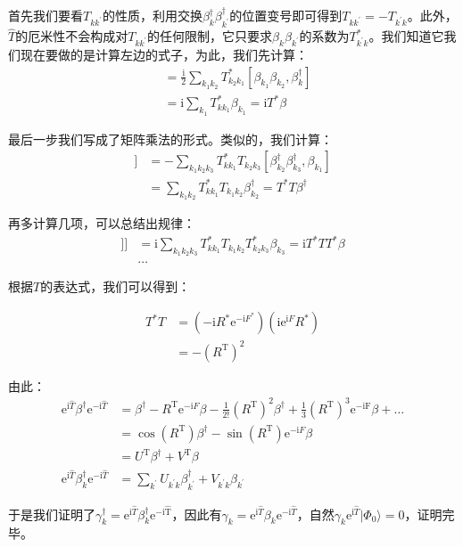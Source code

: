 \begin{booknote*}
首先我们要看$T_{kk^{\prime}}$的性质，利用交换$\beta^{\dagger}_{k}\beta^{\dagger}_{k^{\prime}}$的位置变号即可得到$T_{kk^{\prime}}=-T_{k^{\prime}k}$。此外，$\hat{T}$的厄米性不会构成对$T_{kk^{\prime}}$的任何限制，它只要求$\beta_{k}\beta_{k^{\prime}}$的系数为$T^{*}_{k^{\prime}k}$。我们知道它我们现在要做的是计算左边的式子，为此，我们先计算：
\begin{align*}
[\mathrm{i}\hat{T},\beta^{\dagger}_{k}] & =\frac{\mathrm{i}}{2}\sum_{k_{1}k_{2}}T^{*}_{k_{2}k_{1}}[\beta_{k_{1}}\beta_{k_{2}},\beta^{\dagger}_{k}]\\
 & =\mathrm{i}\sum_{k_{1}}T^{*}_{kk_{1}}\beta_{k_{1}}=\mathrm{i}T^{*}\beta
\end{align*}

最后一步我们写成了矩阵乘法的形式。类似的，我们计算：
\begin{align*}
[\mathrm{i}\hat{T},[\mathrm{i}\hat{T},\beta^{\dagger}_{k}]] & =-\sum_{k_{1}k_{2}k_{3}}T^{*}_{kk_{1}}T_{k_{2}k_{3}}[\beta^{\dagger}_{k_{2}}\beta^{\dagger}_{k_{3}},\beta_{k_{1}}]\\
 & =\sum_{k_{1}k_{2}}T^{*}_{kk_{1}}T_{k_{1}k_{2}}\beta^{\dagger}_{k_{2}}=T^{*}T\beta^{\dagger}
\end{align*}

再多计算几项，可以总结出规律：
\begin{align*}
[\mathrm{i}\hat{T},[\mathrm{i}\hat{T},[\mathrm{i}\hat{T},\beta^{\dagger}_{k}]]] & =\mathrm{i}\sum_{k_{1}k_{2}k_{3}}T^{*}_{kk_{1}}T_{k_{1}k_{2}}T^{*}_{k_{2}k_{3}}\beta_{k_{3}}=\mathrm{i}T^{*}TT^{*}\beta\\
 & \dots
\end{align*}

根据$T$的表达式，我们可以得到：

\begin{align*}
T^{*}T & =(-\mathrm{i}R^{*}\mathrm{e}^{-\mathrm{i}F^{*}})(\mathrm{i}\mathrm{e}^{\mathrm{i}F}R^{*})\\
 & =-(R^{\mathrm{T}})^{2}
\end{align*}

由此：
\begin{align*}
\mathrm{e}^{\mathrm{i}\hat{T}}\beta^{\dagger}\mathrm{e}^{-\mathrm{i}\hat{T}} & =\beta^{\dagger}-R^{\mathrm{T}}\mathrm{e}^{-\mathrm{i}F}\beta-\frac{1}{2!}(R^{\mathrm{T}})^{2}\beta^{\dagger}+\frac{1}{3}(R^{\mathrm{T}})^{3}\mathrm{e}^{\mathrm{-\mathrm{i}F}}\beta+\dots\\
 & =\cos(R^{\mathrm{T}})\beta^{\dagger}-\sin(R^{\mathrm{T}})\mathrm{e}^{-\mathrm{i}F}\beta\\
 & =U^{\mathrm{T}}\beta^{\dagger}+V^{\mathrm{T}}\beta\\
\mathrm{e}^{\mathrm{i}\hat{T}}\beta^{\dagger}_{k}\mathrm{e}^{-\mathrm{i}\hat{T}} & =\sum_{k^{\prime}}U_{k^{\prime}k}\beta^{\dagger}_{k^{\prime}}+V_{k^{\prime}k}\beta_{k^{\prime}}
\end{align*}

于是我们证明了$\gamma^{\dagger}_{k}=\mathrm{e}^{\mathrm{i}\hat{T}}\beta^{\dagger}_{k}\mathrm{e}^{-\mathrm{i\hat{T}}}$，因此有$\gamma_{k}=\mathrm{e}^{\mathrm{i}\hat{T}}\beta_{k}\mathrm{e}^{-\mathrm{i}\hat{T}}$，自然$\gamma_{k}\mathrm{e}^{\mathrm{i}\hat{T}}|\Phi_{0}\rangle=0$，证明完毕。
\end{booknote*}
